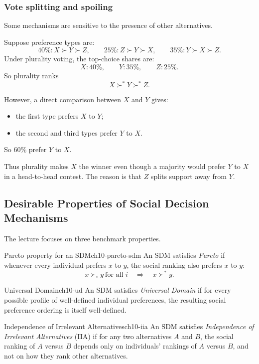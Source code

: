 \subsubsection{Vote splitting and spoiling}

Some mechanisms are sensitive to the presence of other alternatives.

\begin{examplebox}[title={Worked Example: Plurality voting and vote splitting}]
Suppose preference types are:
\[
40\%: X \succ Y \succ Z,
\qquad
25\%: Z \succ Y \succ X,
\qquad
35\%: Y \succ X \succ Z.
\]
Under plurality voting, the top-choice shares are:
\[
X:40\%,\qquad Y:35\%,\qquad Z:25\%.
\]
So plurality ranks
\[
X \succ^* Y \succ^* Z.
\]

However, a direct comparison between $X$ and $Y$ gives:
\begin{itemize}
    \item the first type prefers $X$ to $Y$;
    \item the second and third types prefer $Y$ to $X$.
\end{itemize}
So $60\%$ prefer $Y$ to $X$.

Thus plurality makes $X$ the winner even though a majority would prefer $Y$ to $X$ in a head-to-head contest. The reason is that $Z$ splits support away from $Y$.
\end{examplebox}

\subsection{Desirable Properties of Social Decision Mechanisms}

The lecture focuses on three benchmark properties.

\begin{definition}{Pareto property for an SDM}{ch10-pareto-sdm}
An SDM satisfies \emph{Pareto} if whenever every individual prefers $x$ to $y$, the social ranking also prefers $x$ to $y$:
\[
x \succ_i y \ \text{for all } i
\quad \Longrightarrow \quad
x \succ^* y.
\]
\end{definition}

\begin{definition}{Universal Domain}{ch10-ud}
An SDM satisfies \emph{Universal Domain} if for every possible profile of well-defined individual preferences, the resulting social preference ordering is itself well-defined.
\end{definition}

\begin{definition}{Independence of Irrelevant Alternatives}{ch10-iia}
An SDM satisfies \emph{Independence of Irrelevant Alternatives} (IIA) if for any two alternatives $A$ and $B$, the social ranking of $A$ versus $B$ depends only on individuals' rankings of $A$ versus $B$, and not on how they rank other alternatives.
\end{definition}

